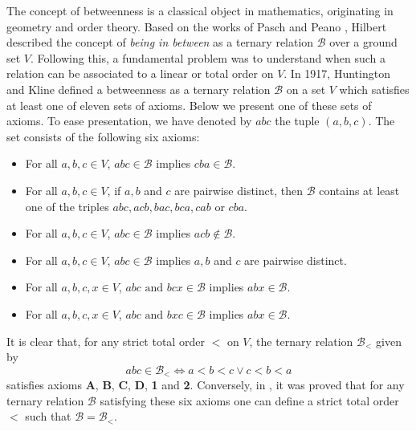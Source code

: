 \documentclass{article}
\newcommand{\calb}{\mathcal{B}}
\begin{document}
The concept of betweenness is a classical object in mathematics, originating in geometry and order theory.  Based on the works of Pasch \cite{pasch} and Peano \cite{peano}, Hilbert \cite{hilbert} described the concept of \textit{being in between} as a ternary relation $\calb$ over a ground set $V$. Following this, a fundamental problem was to understand when such a relation can be associated to a linear or total order on $V$. In 1917, Huntington and Kline \cite{huntkline} defined a betweenness as a ternary relation  $\calb$ on a set $V$ which satisfies at least one of eleven sets of axioms. Below we present one of these sets of axioms. To ease presentation, we have denoted by $abc$ the tuple $(a,b,c)$. The set consists of the following six axioms:
\begin{itemize}
    \item[\textbf{A}] For all $a,b,c\in V$, $abc\in\calb$ implies $cba\in\calb$.
    
    \item[\textbf{B}] For all $a,b,c\in V$, if $a,b$ and $c$ are pairwise distinct, then $\calb$ contains at least one of the triples $abc,acb,bac,bca,cab$ or $cba$.
    
    \item[\textbf{C}] For all $a,b,c\in V$, $abc\in\calb$ implies $acb \notin\calb$.
    
    \item[\textbf{D}]For all $a,b,c\in V$, $abc\in\calb$ implies $a,b$ and $c$ are pairwise distinct.
    
    \item[\textbf{1}] For all $a,b,c,x\in V$, $abc\text{ and } bcx\in\calb$ implies $abx\in\calb$.

    \item[\textbf{2}] For all $a,b,c,x\in V$, $abc\text{ and } bxc \in\calb$ implies $abx\in\calb$.
    
\end{itemize}
It is clear that, for any strict total order $<$ on $V$, the ternary relation  $\calb_<$ given by  $$abc\in\calb_< \iff a<b< c \lor c <b< a$$ satisfies axioms \textbf{A}, \textbf{B}, \textbf{C}, \textbf{D}, \textbf{1} and \textbf{2}. Conversely, in \cite{hunt1935}, it was proved that for any ternary relation $\calb$ satisfying these six axioms one can define a strict total order $<$ such that  $\calb=\calb_<$.

\end{document}
